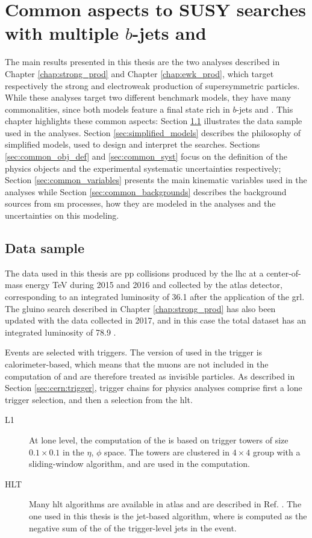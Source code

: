 \chapter{Common aspects to SUSY searches with multiple $b$-jets and \met}
\label{chap:multib_general}

The main results presented in this thesis are the two analyses described in Chapter \ref{chap:strong_prod} and Chapter \ref{chap:ewk_prod}, which target respectively the strong and electroweak production of supersymmetric particles.
While these analyses target two different benchmark models, they have many commonalities, since both models feature 
a final state rich in $b$-jets and \met. This chapter highlights these common aspects: 
Section \ref{sec:common:datasample} illustrates the data sample used in the analyses. 
Section \ref{sec:simplified_models} describes the philosophy of simplified models, used to design and interpret the searches. 
Sections \ref{sec:common_obj_def} and \ref{sec:common_syst} focus on the definition of the physics objects and the experimental systematic uncertainties respectively; Section \ref{sec:common_variables} presents the main kinematic variables used in the analyses 
while Section \ref{sec:common_backgrounds} describes the background sources from \gls{sm} processes, 
how they are modeled in the analyses and the uncertainties on this modeling. 


\section{Data sample}
\label{sec:common:datasample}

The data used in this thesis are \gls{pp} collisions produced by the \gls{lhc} 
at a center-of-mass energy \cmtre TeV during 2015 and 2016 
and collected by the \gls{atlas} detector, corresponding to an integrated luminosity of 36.1 \ifb 
after the application of the \gls{grl}. 
The gluino search described in Chapter \ref{chap:strong_prod} has also been updated with the data collected in 
2017, and in this case the total dataset has an integrated luminosity of 78.9 \ifb. 

Events are selected with \met triggers. 
The version of \met used in the trigger is calorimeter-based, which means that the muons are not included in the computation of \met and are 
therefore treated as invisible particles.  As described in Section \ref{sec:cern:trigger}, 
trigger chains for physics analyses comprise first a \gls{lone} trigger selection, and then a selection from the \gls{hlt}.
\begin{description}
\item[L1] At \gls{lone} level, the computation of the \met is based on trigger towers of size $0.1\times0.1$ in the $\eta$, $\phi$ space. The towers are clustered in $4\times4$ group with a sliding-window algorithm, and are used in the \met computation.
\item[HLT] Many \gls{hlt} \met algorithms are available in \gls{atlas} and are described in Ref. \cite{Aaboud:2016leb}. 
The one used in this thesis is the jet-based algorithm, where \met is computed as the negative sum of the \pt of the trigger-level jets in the event. 
\end{description}

